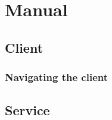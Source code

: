 \chapter{Manual}
\label{Manual}

\section{Client}
\label{Manual_Client}

\subsection{Navigating the client}
\label{Manual_Client_Navigation}

\section{Service}
\label{Manual_Service}
